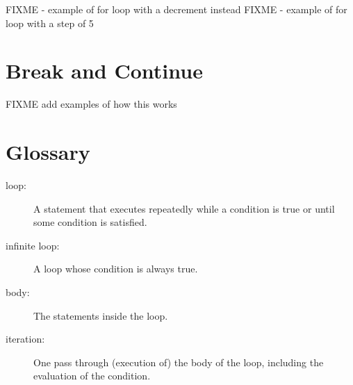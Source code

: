 FIXME - example of for loop with a decrement instead
FIXME - example of for loop with a step of 5

\section{Break and Continue}
FIXME add examples of how this works
\section{Glossary}

\begin{description}

\item[loop:]  A statement that executes repeatedly while a
condition is true or until some condition is satisfied.

\item[infinite loop:]  A loop whose condition is always true.

\item[body:]  The statements inside the loop.

\item[iteration:]  One pass through (execution of) the body
of the loop, including the evaluation of the condition.




\end{description}

